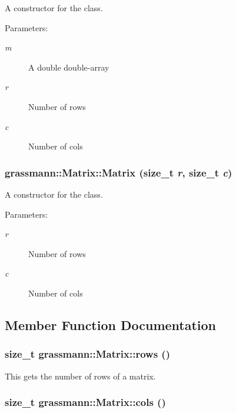 A constructor for the class. 

\begin{Desc}
\item[Parameters:]
\begin{description}
\item[{\em m}]A double double-array \item[{\em r}]Number of rows \item[{\em c}]Number of cols \end{description}
\end{Desc}
\hypertarget{classgrassmann_1_1Matrix_1dfe3208dad7f6bde0744b6b2a7146a5}{
\subsubsection[Matrix]{\setlength{\rightskip}{0pt plus 5cm}grassmann::Matrix::Matrix (size\_\-t {\em r}, \/  size\_\-t {\em c})}}
\label{classgrassmann_1_1Matrix_1dfe3208dad7f6bde0744b6b2a7146a5}


A constructor for the class. 

\begin{Desc}
\item[Parameters:]
\begin{description}
\item[{\em r}]Number of rows \item[{\em c}]Number of cols \end{description}
\end{Desc}


\subsection{Member Function Documentation}
\hypertarget{classgrassmann_1_1Matrix_1d0d6d6e85cce10485ede7b5780b92de}{
\subsubsection[rows]{\setlength{\rightskip}{0pt plus 5cm}size\_\-t grassmann::Matrix::rows ()}}
\label{classgrassmann_1_1Matrix_1d0d6d6e85cce10485ede7b5780b92de}


This gets the number of rows of a matrix. 

\hypertarget{classgrassmann_1_1Matrix_1e018c566cf70b50d1307258036c2765}{
\subsubsection[cols]{\setlength{\rightskip}{0pt plus 5cm}size\_\-t grassmann::Matrix::cols ()}}
\label{classgrassmann_1_1Matrix_1e018c566cf70b50d1307258036c2765}


